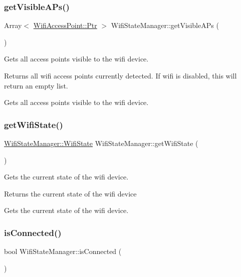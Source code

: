 \subsubsection{\texorpdfstring{get\+Visible\+A\+Ps()}{getVisibleAPs()}}
{\footnotesize\ttfamily Array$<$ \mbox{\hyperlink{classWifiAccessPoint_ad18977f884076774803027efbaa131a0}{Wifi\+Access\+Point\+::\+Ptr}} $>$ Wifi\+State\+Manager\+::get\+Visible\+A\+Ps (\begin{DoxyParamCaption}{ }\end{DoxyParamCaption})}

Gets all access points visible to the wifi device.

\begin{DoxyReturn}{Returns}
all wifi access points currently detected. If wifi is disabled, this will return an empty list.
\end{DoxyReturn}
Gets all access points visible to the wifi device. \mbox{\label{classWifiStateManager_a204b08dd7e75bf62cbf3eccf51acda8e}} 
\subsubsection{\texorpdfstring{get\+Wifi\+State()}{getWifiState()}}
{\footnotesize\ttfamily \mbox{\hyperlink{classWifiStateManager_a1b2ed840606c57c43d4a147c96d43128}{Wifi\+State\+Manager\+::\+Wifi\+State}} Wifi\+State\+Manager\+::get\+Wifi\+State (\begin{DoxyParamCaption}{ }\end{DoxyParamCaption})}

Gets the current state of the wifi device.

\begin{DoxyReturn}{Returns}
the current state of the wifi device
\end{DoxyReturn}
Gets the current state of the wifi device. \mbox{\label{classWifiStateManager_a511a634fb6d9744a6c0c94d9171c9b5c}} 
\subsubsection{\texorpdfstring{is\+Connected()}{isConnected()}}
{\footnotesize\ttfamily bool Wifi\+State\+Manager\+::is\+Connected (\begin{DoxyParamCaption}{ }\end{DoxyParamCaption})}

